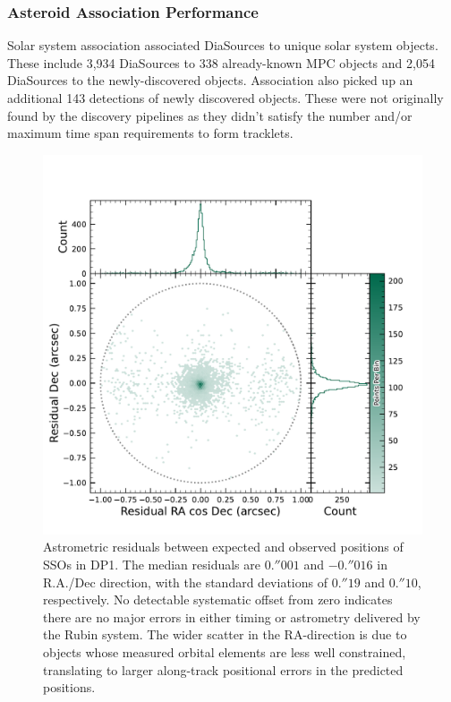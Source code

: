 \subsubsection{Asteroid Association Performance}

Solar system association associated \nsolarsystemsources DiaSources to \nsolarsystemobjects unique solar system objects.
These include 3,934 DiaSources to 338 already-known \gls{MPC} objects and 2,054 DiaSources to the \nnewasteroiddiscoveries  newly-discovered objects.
Association also picked up an additional 143 detections of newly discovered objects.
These were not originally found by the discovery pipelines as they didn't satisfy the number and/or maximum time span requirements to form tracklets.

\begin{figure}[htb!]
\centering
\includegraphics[width=0.98\linewidth]{figures/sso_residuals.pdf}
\caption{Astrometric residuals between expected and observed positions of SSOs in \gls{DP1}. The median residuals are $0.''001$ and $-0.''016$ in R.A./Dec direction, with the standard deviations of $0.''19$ and $0.''10$, respectively. No detectable systematic offset from zero indicates there are no major errors in either timing or astrometry delivered by the Rubin system. The wider scatter in the RA-direction is due to objects whose measured orbital elements are less well constrained, translating to larger along-track positional errors in the predicted positions.}
\label{fig:sso_residuals}
\vspace{0.1cm}
\end{figure}

